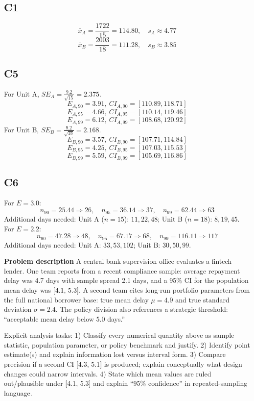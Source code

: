 \begin{ExamProblems}
		\subsection*{C1}
		\[
		\bar{x}_A=\frac{1722}{15}=114.80,
		\quad s_A\approx4.77
		\]
		\[
		\bar{x}_B=\frac{2003}{18}=111.28,
		\quad s_B\approx3.85
		\]
		
		\subsection*{C5}
		For Unit A, $SE_A=\frac{9.2}{\sqrt{15}}=2.375$.
		\[
		E_{A,90}=3.91,\ CI_{A,90}=[110.89,118.71]
		\]
		\[
		E_{A,95}=4.66,\ CI_{A,95}=[110.14,119.46]
		\]
		\[
		E_{A,99}=6.12,\ CI_{A,99}=[108.68,120.92]
		\]
		For Unit B, $SE_B=\frac{9.2}{\sqrt{18}}=2.168$.
		\[
		E_{B,90}=3.57,\ CI_{B,90}=[107.71,114.84]
		\]
		\[
		E_{B,95}=4.25,\ CI_{B,95}=[107.03,115.53]
		\]
		\[
		E_{B,99}=5.59,\ CI_{B,99}=[105.69,116.86]
		\]
		
		\subsection*{C6}
		For $E=3.0$:
		\[
		n_{90}=25.44\Rightarrow26,\quad n_{95}=36.14\Rightarrow37,\quad n_{99}=62.44\Rightarrow63
		\]
		Additional days needed:
		Unit A ($n=15$): $11,22,48$; Unit B ($n=18$): $8,19,45$.
		For $E=2.2$:
		\[
		n_{90}=47.28\Rightarrow48,\quad n_{95}=67.17\Rightarrow68,\quad n_{99}=116.11\Rightarrow117
		\]
		Additional days needed:
		Unit A: $33,53,102$; Unit B: $30,50,99$.

		\newpage
		\item
		\textbf{Problem description}
		A central bank supervision office evaluates a fintech lender.
		One team reports from a recent compliance sample: average repayment delay was 4.7 days with sample spread 2.1 days, and a 95\% CI for the population mean delay was [4.1, 5.3].
		A second team cites long-run portfolio parameters from the full national borrower base: true mean delay $\mu=4.9$ and true standard deviation $\sigma=2.4$.
		The policy division also references a strategic threshold: ``acceptable mean delay below 5.0 days.''
		
		Explicit analysis tasks:
		1) Classify every numerical quantity above as sample statistic, population parameter, or policy benchmark and justify.
		2) Identify point estimate(s) and explain information lost versus interval form.
		3) Compare precision if a second CI [4.3, 5.1] is produced; explain conceptually what design changes could narrow intervals.
		4) State which mean values are ruled out/plausible under [4.1, 5.3] and explain ``95\% confidence'' in repeated-sampling language.
		

\end{ExamProblems}
